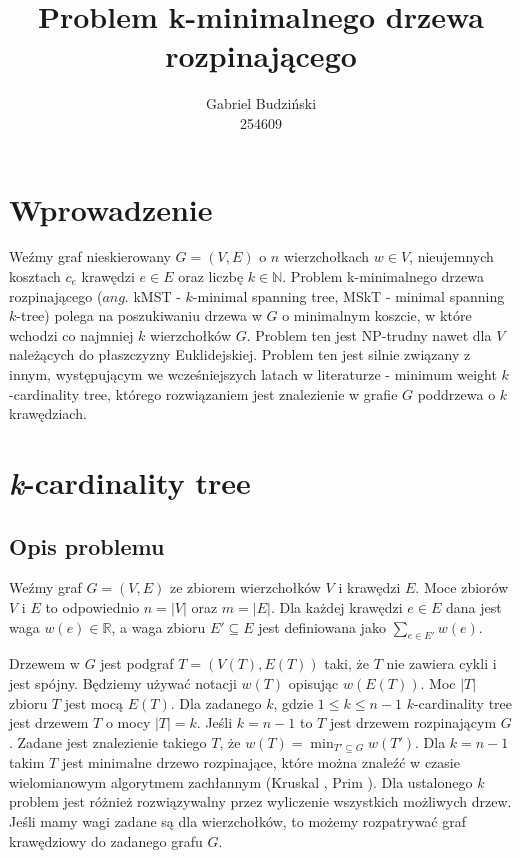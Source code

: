 \documentclass[12pt]{article}
\title{Problem k-minimalnego drzewa rozpinającego}
\author{Gabriel Budziński\\254609}
\begin{document}
\maketitle

\section{Wprowadzenie}

Weźmy graf nieskierowany $G=(V,E)$ o $n$ wierzchołkach $w \in V$, nieujemnych kosztach $c_e$ krawędzi $e \in E$ oraz liczbę $k \in \mathbb{N}$. Problem k-minimalnego drzewa rozpinającego ($\textit{ang.}$ kMST - $k$-minimal spanning tree, MSkT - minimal spanning $k$-tree) polega na poszukiwaniu drzewa w $G$ o minimalnym koszcie, w które wchodzi co najmniej $k$ wierzchołków $G$. Problem ten jest NP-trudny nawet dla $V$ należących do płaszczyzny Euklidejskiej. Problem ten jest silnie związany z innym, występującym we wcześniejszych latach w literaturze \cite{k_card_trees} - minimum weight $k$-cardinality tree, którego rozwiązaniem jest znalezienie w grafie $G$ poddrzewa o $k$ krawędziach.

\section{\textit{k}-cardinality tree}

\subsection{Opis problemu}
Weźmy graf $G = (V,E)$ ze zbiorem wierzchołków $V$ i krawędzi $E$. Moce zbiorów $V$ i $E$ to odpowiednio $n = |V|$ oraz $m = |E|$. Dla każdej krawędzi $e \in E$ dana jest waga $w(e) \in \mathbb{R}$, a waga zbioru $E' \subseteq E$ jest definiowana jako $\sum_{e \in E'}{w(e)}$.

Drzewem w $G$ jest podgraf $T = (V(T), E(T))$ taki, że $T$ nie zawiera cykli i jest spójny. Będziemy używać notacji $w(T)$ opisując $w(E(T))$. Moc $|T|$ zbioru $T$ jest mocą $E(T)$. Dla zadanego $k$, gdzie $1 \leq k \leq n-1$ $k$-cardinality tree jest drzewem $T$ o mocy $|T| = k$. Jeśli $k = n-1$ to $T$ jest drzewem rozpinającym $G$. Zadane jest znalezienie takiego $T$, że $w(T) = \min_{T' \subseteq G}{w(T')}$. Dla $k = n-1$ takim $T$ jest minimalne drzewo rozpinające, które można znaleźć w czasie wielomianowym algorytmem zachłannym (Kruskal \cite{kruskal}, Prim \cite{prim}). Dla ustalonego $k$ problem jest różnież rozwiązywalny przez wyliczenie wszystkich możliwych drzew. Jeśli mamy wagi zadane są dla wierzchołków, to możemy rozpatrywać graf krawędziowy do zadanego grafu $G$.
\end{document}
